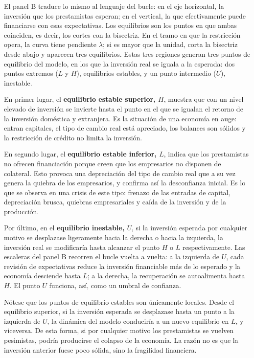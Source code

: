 \documentclass[10pt,a4paper]{article}
\begin{document}
El panel B traduce lo mismo al lenguaje del bucle: en el eje horizontal, la inversión que los prestamistas esperan; en el vertical, la que efectivamente puede financiarse con esas expectativas. Los equilibrios son los puntos en que ambas coinciden, es decir, los cortes con la bisectriz. En el tramo en que la restricción opera, la curva tiene pendiente $\lambda$; si es mayor que la unidad, corta la bisectriz desde abajo y aparecen tres equilibrios. Estas tres regiones generan tres puntos de equilibrio del modelo, en los que la inversión real se iguala a la esperada: dos puntos extremos ($L$ y $H$), equilibrios estables, y un punto intermedio ($U$), inestable.

En primer lugar, el \textbf{equilibrio estable superior, $H$}, muestra que con un nivel elevado de inversión se invierte hasta el punto en el que se igualan el retorno de la inversión doméstica y extranjera. Es la situación de una economía en auge: entran capitales, el tipo de cambio real está apreciado, los balances son sólidos y la restricción de crédito no limita la inversión.

En segundo lugar, el \textbf{equilibrio estable inferior, $L$}, indica que los prestamistas no ofrecen financiación porque creen que los empresarios no disponen de colateral. Esto provoca una depreciación del tipo de cambio real que a su vez genera la quiebra de los empresarios, y confirma así la desconfianza inicial. Es lo que se observa en una crisis de este tipo: frenazo de las entradas de capital, depreciación brusca, quiebras empresariales y caída de la inversión y de la producción.

Por último, en el \textbf{equilibrio inestable, $U$}, si la inversión esperada por cualquier motivo se desplazase ligeramente hacia la derecha o hacia la izquierda, la inversión real se modificaría hasta alcanzar el punto $H$ o $L$ respectivamente. Las escaleras del panel B recorren el bucle vuelta a vuelta: a la izquierda de $U$, cada revisión de expectativas reduce la inversión financiable más de lo esperado y la economía desciende hasta $L$; a la derecha, la recuperación se autoalimenta hasta $H$. El punto $U$ funciona, así, como un umbral de confianza.

Nótese que los puntos de equilibrio estables son únicamente locales. Desde el equilibrio superior, si la inversión esperada se desplazase hasta un punto a la izquierda de $U$, la dinámica del modelo conduciría a un nuevo equilibrio en $L$, y viceversa. De esta forma, si por cualquier motivo los prestamistas se vuelven pesimistas, podría producirse el colapso de la economía. La razón no es que la inversión anterior fuese poco sólida, sino la fragilidad financiera.
\end{document}
